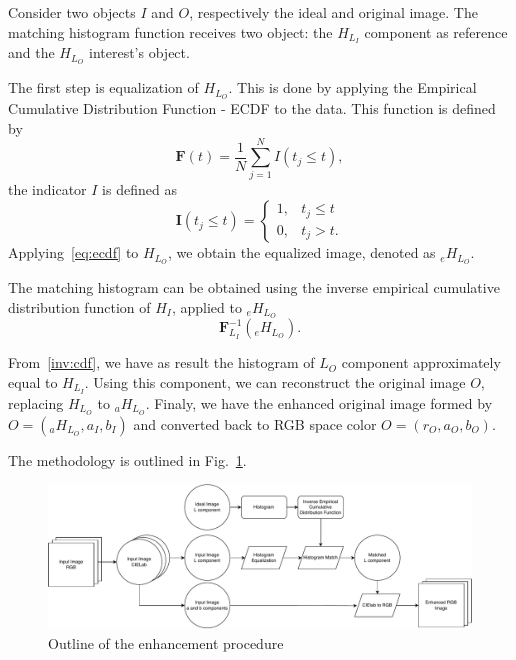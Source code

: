 \documentclass{article}
\begin{document}
Consider two objects $I$ and $O$, respectively the ideal and original image.
The matching histogram function receives two object: the $H_{L_I}$ component as reference and the $H_{L_O}$ interest's object. 

The first step is equalization of $H_{L_O}$. 
This is done by applying the Empirical Cumulative Distribution Function - ECDF to the data.
This function is defined by 
\begin{equation}
    \bm F(t) = \frac1N\sum_{j=1}^N I(t_j \leq t) ,
    \label{eq:ecdf}
\end{equation}
the indicator $I$ is defined as
\begin{equation}
    \bm I(t_j \leq t) = \begin{cases}
        1,  & t_j \leq t \\
        0,  & t_j > t.
    \end{cases}
\end{equation}
Applying~\eqref{eq:ecdf} to $H_{L_O}$, we obtain the equalized image, denoted as $_eH_{L_O}$. 

The matching histogram can be obtained using the inverse empirical cumulative distribution function of $H_I$, applied to $_eH_{L_O}$
\begin{equation}
    \bm F^{-1}_{L_I}(_eH_{L_O}).
    \label{inv:cdf}
\end{equation}

From~\eqref{inv:cdf}, we have as result the histogram of $L_O$ component approximately equal to $H_{L_I}$. 
Using this component, we can reconstruct the original image $O$, replacing $H_{L_O}$ to $_aH_{L_O}$. 
Finaly, we have the enhanced original image formed by $O = (_aH_{L_O}, a_I, b_I)$ and converted back to RGB space color $O = (r_O, a_O, b_O)$.

The methodology is outlined in Fig.~\ref{Fig:Outline}.

\begin{figure}
	\centering
	\includegraphics[width=.9\linewidth]{../../Diagrams/Outline}
	\caption{Outline of the enhancement procedure}\label{Fig:Outline}
\end{figure}
\end{document}
